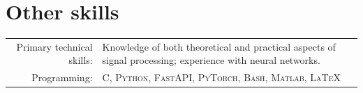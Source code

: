\documentclass[a4paper,11pt]{article}
\begin{document}

    \vspace{25pt}

    \section{Other skills}

    \begin{tabular}{rp{11cm}}
  	Primary technical skills:  & Knowledge of both theoretical and practical aspects of signal processing; experience with neural networks.
    \vspace{5pt}\\
  	Programming:       &  \textsc{C, Python, FastAPI, PyTorch, Bash, Matlab, \LaTeX}  \vspace{5pt}\\

    \end{tabular}


  \newpage

  \begin{bibunit}
    \renewcommand\refname{Publications: Science}

    \nocite{
      goujonStableParametrizationContinuous2022,
      camposLearningContinuousPiecewiseLinear2022,
      aziznejadMeasuringComplexityLearning2021,
      bohraLearningActivationFunctions2020,
      aziznejadDeepNeuralNetworks2020,
      djelouahNeuralInterFrameCompression2019,
      camposContentAdaptiveOptimization2019}

  \end{bibunit}

  \vspace{25pt}

  \begin{bibunit}
    \renewcommand\refname{Publications: Philosophy}

    \nocite{
      camposMahayanaBuddhistEthicsWork-in-Progress,
      camposWrongnessKillingNonHuman2018}

  \end{bibunit}
\end{document}
